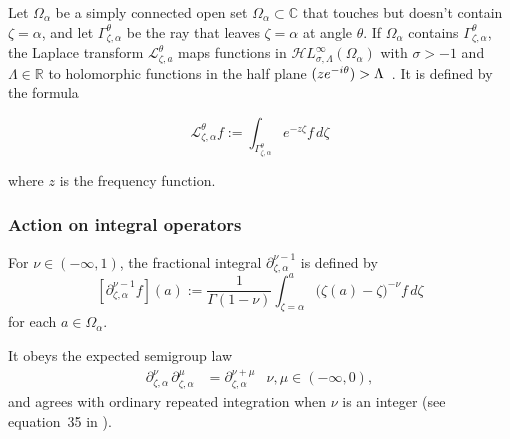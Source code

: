 \documentclass{article}
\theoremstyle{plain}
\newcommand{\R}{\mathbb{R}}
\newcommand{\C}{\mathbb{C}}
\let\Re\relax
\DeclareMathOperator{\Re}{Re}
\newcommand{\laplace}{\mathcal{L}}
\newcommand{\fracderiv}[3]{\partial^{#1}_{#2, #3}}
\newcommand{\singexp}[2]{\mathcal{H}L^\infty_{#1, #2}}
\newcommand{\domain}{\Omega}
\begin{document}

Let $\domain_\alpha$ be a simply connected open set $\domain_\alpha\subset\C$ that touches but doesn't contain $\zeta=\alpha$, and let $\Gamma_{\zeta, \alpha}^\theta$ be the ray that leaves $\zeta=\alpha$ at angle $\theta$. If $\domain_\alpha$ contains $\Gamma_{\zeta, \alpha}^\theta$, the Laplace transform $\laplace_{\zeta, a}^{\theta} $ maps functions in $\singexp{\sigma}{\Lambda}(\domain_\alpha)$ with $\sigma>-1$ and $\Lambda\in\R$ to holomorphic functions in the half plane $\Re(z e^{-i\theta}) > \Lambda$~\cite[Section 5.6]{diverg-resurg-i}. It is defined by the formula

\begin{equation}\label{laplace:int} 
\laplace_{\zeta, \alpha}^{\theta} f := \int_{\Gamma_{\zeta,\alpha}^\theta} e^{-z\zeta} f\, d\zeta
\end{equation}

where $z$ is the frequency function. 



\subsubsection{Action on integral operators}\label{L-int-op}
For $\nu \in (-\infty, 1)$, the fractional integral $\partial^{\nu-1}_{\zeta, \alpha}$ is defined by
\[ [\partial^{\nu-1}_{\zeta, \alpha} f](a) := \frac{1}{\Gamma(1-\nu)} \int_{\zeta = \alpha}^a \big(\zeta(a)-\zeta\big)^{-\nu} f\,d\zeta \]
for each $a \in \domain_\alpha$.

It obeys the expected semigroup law \cite[Section  1.3]{mladenov2014advanced}
\begin{align*}
\fracderiv{\nu}{\zeta}{\alpha}\,\fracderiv{\mu}{\zeta}{\alpha} & = \fracderiv{\nu+\mu}{\zeta}{\alpha} & \nu, \mu \in (-\infty, 0),
\end{align*}
and agrees with ordinary repeated integration when $\nu$ is an integer (see equation~35 in \cite{mladenov2014advanced}).

\end{document}
